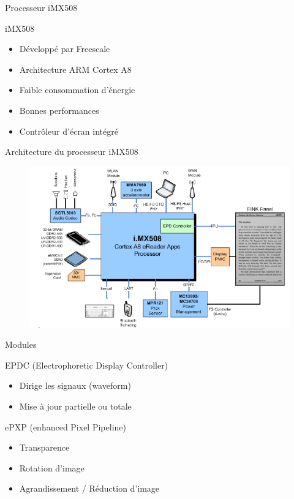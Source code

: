 \begin{frame}{Processeur iMX508} %
	\begin{block}{iMX508}
	\begin{itemize}
		\item{Développé par Freescale}
		\item{Architecture ARM Cortex A8}
		\item{Faible consommation d'énergie}
		\item{Bonnes performances}
		\item{Contrôleur d'écran intégré}
	\end{itemize}
	\end{block}
\end{frame}

\begin{frame}{Architecture du processeur iMX508} %
	\begin{figure}
		\begin{center}
			\includegraphics[scale=0.65]{iMX508.png}
		\end{center}
	\end{figure}
\end{frame}

\begin{frame}{Modules}
	\begin{block}{EPDC (Electrophoretic Display Controller)}
		\begin{itemize}
			\item{Dirige les signaux (waveform)}
			\item{Mise à jour partielle ou totale}
		\end{itemize}
	\end{block}
	\begin{block}{ePXP (enhanced Pixel Pipeline)}
		\begin{itemize}
			\item Transparence
			\item Rotation d'image
			\item Agrandissement / Réduction d'image
		\end{itemize}
	\end{block}
\end{frame}

